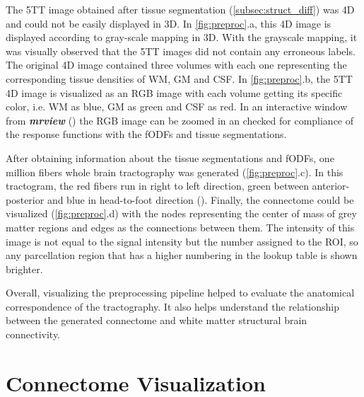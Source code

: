 \documentclass[msthesis.tex]{subfiles}
\begin{document}
The \gls{5TT} image obtained after tissue segmentation (\autoref{subsec:struct_diff}) was 4D and could not be easily displayed in 3D. In \autoref{fig:preproc}.a, this 4D image is displayed according to gray-scale mapping in 3D. With the grayscale mapping, it was visually observed that the \gls{5TT} images did not contain any erroneous labels. The original 4D image contained three volumes with each one representing the corresponding tissue densities of \gls{WM}, \gls{GM} and \gls{CSF}. In \autoref{fig:preproc}.b, the \gls{5TT} 4D image is visualized as an \gls{RGB} image with each volume getting its specific color, i.e. \gls{WM} as blue, \gls{GM} as green and \gls{CSF} as red. In an interactive window from \textbf{\textit{mrview}} (\cite{tournier2019mrtrix3}) the \gls{RGB} image can be zoomed in an checked for compliance of the response functions with the \gls{fODF}s and tissue segmentations. 

After obtaining information about the tissue segmentations and \gls{fODF}s, one million fibers whole brain tractography was generated (\autoref{fig:preproc}.c). In this tractogram, the red fibers run in right to left direction, green between anterior-posterior and blue in head-to-foot direction (\cite{hobert2013evaluation}). Finally, the connectome could be visualized (\autoref{fig:preproc}.d) with the nodes representing the center of mass of grey matter regions and edges as the connections between them. The intensity of this image is not equal to the signal intensity but the number assigned to the ROI, so any parcellation region that has a higher numbering in the lookup table is shown brighter. 

Overall, visualizing the preprocessing pipeline helped to evaluate the anatomical correspondence of the tractography. It also helps understand the relationship between the generated connectome and white matter structural brain connectivity.

\section{Connectome Visualization}
\end{document}

